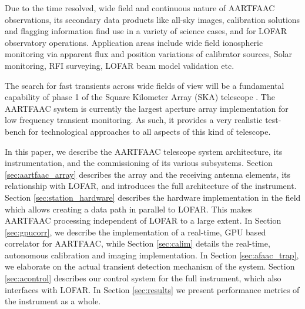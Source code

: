 \documentclass{ws-jai}
\begin{document}
Due  to  the  time  resolved,  wide field  and  continuous  nature  of  AARTFAAC
observations,  its  secondary data  products  like  all-sky images,  calibration
solutions and flagging  information find use in a variety  of science cases, and
for  LOFAR  observatory  operations.    Application  areas  include  wide  field
ionospheric monitoring via  apparent flux and position  variations of calibrator
sources, Solar monitoring, RFI surveying, LOFAR beam model validation etc.

The search for fast transients across wide  fields of view will be a fundamental
capability  of   phase  1  of   the  Square  Kilometer  Array   (SKA)  telescope
\cite{colegate2011searching}.   The AARTFAAC  system  is  currently the  largest
aperture array implementation  for low frequency transient  monitoring. As such,
it  provides a  very realistic  test-bench for  technological approaches  to all
aspects of this kind of telescope.


In  this paper,  we describe  the  AARTFAAC telescope  system architecture,  its
instrumentation,  and  the commissioning  of  its  various subsystems.   Section
\ref{sec:aartfaac_array} describes the array and the receiving antenna elements,
its  relationship  with LOFAR,  and  introduces  the  full architecture  of  the
instrument.    Section   \ref{sec:station_hardware}   describes   the   hardware
implementation in  the field which  allows creating a  data path in  parallel to
LOFAR. This  makes AARTFAAC processing independent  of LOFAR to a  large extent.
In Section \ref{sec:gpucorr}, we describe the implementation of a real-time, GPU
based  correlator  for  AARTFAAC,  while  Section  \ref{sec:calim}  details  the
real-time,  autonomous  calibration  and   imaging  implementation.  In  Section
\ref{sec:afaac_trap}, we  elaborate on the actual  transient detection mechanism
of the system.  Section \ref{sec:acontrol}  describes our control system for the
full instrument, which also interfaces with LOFAR.  In Section \ref{sec:results}
we present performance metrics of the instrument as a whole.
\end{document}
